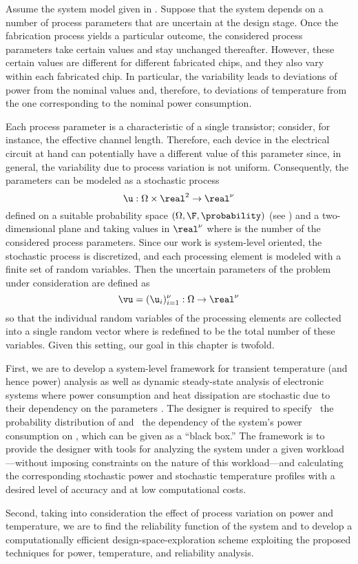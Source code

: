 Assume the system model given in . Suppose that the system
depends on a number of process parameters that are uncertain at the design
stage. Once the fabrication process yields a particular outcome, the considered
process parameters take certain values and stay unchanged thereafter. However,
these certain values are different for different fabricated chips, and they also
vary within each fabricated chip. In particular, the variability leads to
deviations of power from the nominal values and, therefore, to deviations of
temperature from the one corresponding to the nominal power consumption.

Each process parameter is a characteristic of a single transistor; consider, for
instance, the effective channel length. Therefore, each device in the electrical
circuit at hand can potentially have a different value of this parameter since,
in general, the variability due to process variation is not uniform.
Consequently, the parameters can be modeled as a stochastic process
\[
  \u: \Omega \times \real^2 \to \real^\nu
\]
defined on a suitable probability space $(\Omega, \F, \probability)$ (see
) and a two-dimensional plane and taking values in
$\real^\nu$ where \nu is the number of the considered process parameters. Since
our work is system-level oriented, the stochastic process is discretized, and
each processing element is modeled with a finite set of random variables. Then
the uncertain parameters of the problem under consideration are defined as
\[
  \vu = (\u_i)_{i = 1}^\nu: \Omega \to \real^\nu
\]
so that the individual random variables of the processing elements are collected
into a single random vector where \nu is redefined to be the total number of
these variables. Given this setting, our goal in this chapter is twofold.

First, we are to develop a system-level framework for transient temperature (and
hence power) analysis as well as dynamic steady-state analysis of electronic
systems where power consumption and heat dissipation are stochastic due to their
dependency on the parameters \vu. The designer is required to specify \one~the
probability distribution of \vu and \two~the dependency of the system's power
consumption on \vu, which can be given as a ``black box.'' The framework is to
provide the designer with tools for analyzing the system under a given
workload---without imposing constraints on the nature of this workload---and
calculating the corresponding stochastic power \mp and stochastic temperature
\mq profiles with a desired level of accuracy and at low computational costs.

Second, taking into consideration the effect of process variation on power and
temperature, we are to find the reliability function of the system and to
develop a computationally efficient design-space-exploration scheme exploiting
the proposed techniques for power, temperature, and reliability analysis.
